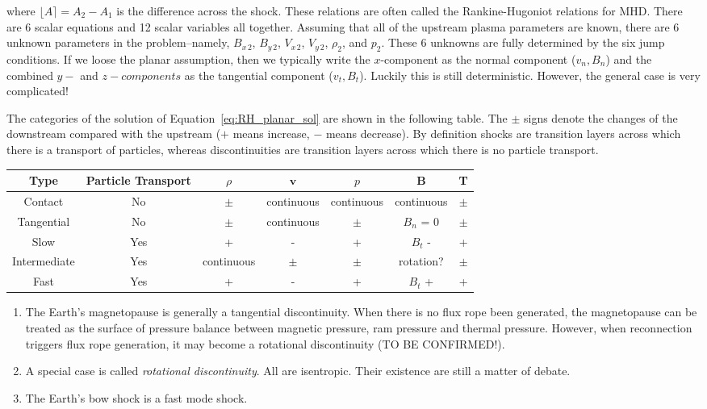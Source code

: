\documentclass[
  notoc %
]{tufte-book}
\begin{document}
where \(\lfloor A \rceil = A_2 - A_1\) is the difference across the
shock. These relations are often called the Rankine-Hugoniot relations
for MHD. There are 6 scalar equations and 12 scalar variables all
together. Assuming that all of the upstream plasma parameters are known,
there are 6 unknown parameters in the problem--namely, \(B_{x\,2}\),
\(B_{y\,2}\), \(V_{x\,2}\), \(V_{y\,2}\), \(\rho_2\), and \(p_2\). These
6 unknowns are fully determined by the six jump conditions. If we loose
the planar assumption, then we typically write the \(x\)-component as
the normal component (\(v_n, B_n\)) and the combined \(y-\) and
\(z-components\) as the tangential component (\(v_t,B_t\)). Luckily this
is still deterministic. However, the general case is very complicated!

The categories of the solution of Equation~\ref{eq:RH_planar_sol} are
shown in the following table. The \(\pm\) signs denote the changes of
the downstream compared with the upstream (\(+\) means increase, \(-\)
means decrease). By definition shocks are transition layers across which
there is a transport of particles, whereas discontinuities are
transition layers across which there is no particle transport.

\begin{longtable}[]{@{}ccccccc@{}}
\toprule
Type & Particle Transport & \(\rho\) & \(\mathbf{v}\) & \(p\) &
\(\mathbf{B}\) & T \\
\midrule
\endhead
Contact & No & \(\pm\) & continuous & continuous & continuous &
\(\pm\) \\
Tangential & No & \(\pm\) & continuous & \(\pm\) & \(B_n\) = 0 &
\(\pm\) \\
Slow & Yes & + & - & + & \(B_t\) - & + \\
Intermediate & Yes & continuous & \(\pm\) & \(\pm\) & rotation? &
\(\pm\) \\
Fast & Yes & + & - & + & \(B_t\) + & + \\
\bottomrule
\end{longtable}

\begin{enumerate}
\def\labelenumi{\arabic{enumi}.}
\item
  The Earth's magnetopause is generally a tangential discontinuity. When
  there is no flux rope been generated, the magnetopause can be treated
  as the surface of pressure balance between magnetic pressure, ram
  pressure and thermal pressure. However, when reconnection triggers
  flux rope generation, it may become a rotational discontinuity (TO BE
  CONFIRMED!).
\item
  A special case is called \emph{rotational discontinuity}. All are
  isentropic. Their existence are still a matter of debate.
\item
  The Earth's bow shock is a fast mode shock.
\end{enumerate}
\end{document}
